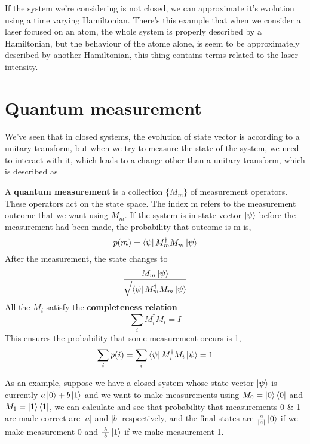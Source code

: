 If the system we're considering is not closed, we can approximate it's evolution using a time varying Hamiltonian. There's this example that when we consider a laser focused on an atom, the whole system is properly described by a Hamiltonian, but the behaviour of the atome alone, is seem to be approximately described by another Hamiltonian, this thing contains terms related to the laser intensity.

\section{Quantum measurement}

We've seen that in closed systems, the evolution of state vector is according to a unitary transform, but when we try to measure the state of the system, we need to interact with it, which leads to a change other than a unitary transform, which is described as

\begin{postulate}
    A \textbf{quantum measurement} is a collection $\{M_m\}$ of measurement operators. These operators act on the state space. The index m refers to the measurement outcome that we want using $M_m$. If the system is in state vector $\ket{\psi}$ before the measurement had been made, the probability that outcome is m is,
    \begin{equation}
        \label{eq:measurement_probability}
        p(m) = \bra{\psi}M_m^\dag M_m\ket{\psi}
    \end{equation}
    After the measurement, the state changes to
    \begin{equation}
        \frac{M_m\ket{\psi}}{\sqrt{\bra{\psi}M_m^\dag M_m\ket{\psi}}}
    \end{equation}
    All the $M_i$ satisfy the \textbf{completeness relation}
    \begin{equation}
        \sum_i M_i^\dag M_i = I
    \end{equation}
    This ensures the probability that some measurement occurs is 1,
    \begin{equation}
        \sum_i p(i) = \sum_i \bra{\psi}M_i^\dag M_i\ket{\psi} = 1
    \end{equation}
\end{postulate}

As an example, suppose we have a closed system whose state vector $\ket{\psi}$ is currently $a\ket{0} + b\ket{1}$ and we want to make measurements using $M_0 = \ket{0}\bra{0}$ and $M_1 = \ket{1}\bra{1}$, we can calculate and see that probability that measurements 0 \& 1 are made correct are $|a|$ and $|b|$ respectively, and the final states are
$\frac{a}{|a|}\ket{0}$ if we make measurement 0 and $\frac{b}{|b|}\ket{1}$ if we make measurement 1.

